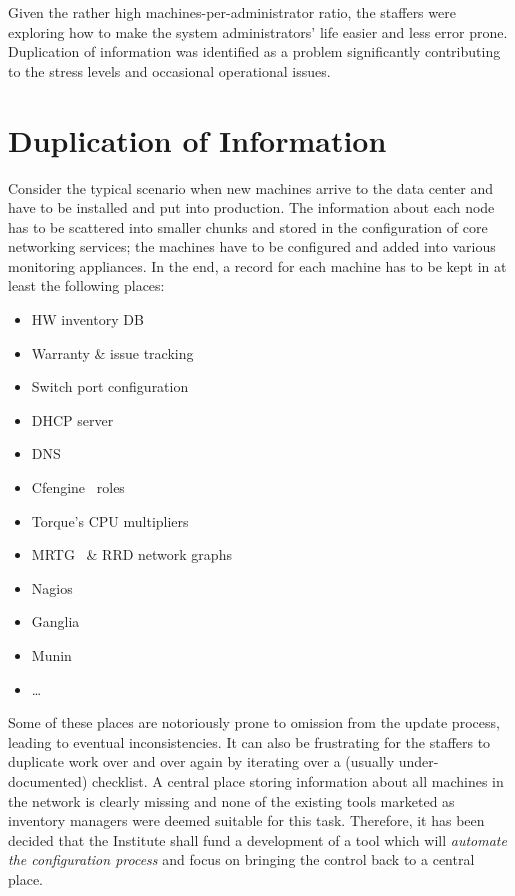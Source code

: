 \documentclass[a4paper]{jpconf}
\begin{document}
Given the rather high machines-per-administrator ratio, the staffers were exploring how to make the system administrators' life easier
and less error prone.  Duplication of information was identified as a problem significantly contributing to the stress levels and
occasional operational issues.

\section{Duplication of Information}

Consider the typical scenario when new machines arrive to the data center and have to be installed and put into
production.  The information about each node has to be scattered into smaller chunks and stored in the configuration of core networking
services; the machines have to be configured and added into various monitoring appliances.  In the end, a record for each machine has
to be kept in at least the following places:

\begin{itemize}
    \item HW inventory DB
    \item Warranty \& issue tracking
    \item Switch port configuration
    \item DHCP server
    \item DNS
    \item Cfengine~\cite{cfengine} roles
    \item Torque's CPU multipliers
    \item MRTG~\cite{mrtg} \& RRD network graphs
    \item Nagios~\cite{nagios}
    \item Ganglia~\cite{ganglia}
    \item Munin~\cite{munin}
    \item \ldots
\end{itemize}

Some of these places are notoriously prone to omission from the update process, leading to eventual inconsistencies.  It can also be
frustrating for the staffers to duplicate work over and over again by iterating over a (usually under-documented) checklist.  A central
place storing information about all machines in the network is clearly missing and none of the existing tools marketed as inventory
managers were deemed suitable for this task.  Therefore, it has been decided that the Institute shall fund a development of a tool
which will {\em automate the configuration process} and focus on bringing the control back to a central place.
\end{document}
